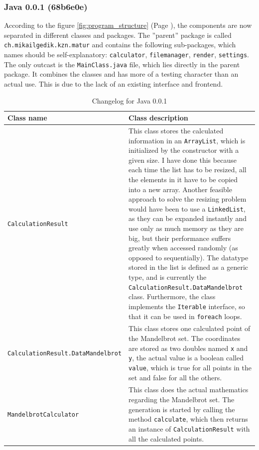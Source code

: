 \documentclass[10pt,a4paper,titlepage]{article}
\begin{document}
	\subsubsection{Java 0.0.1 (68b6e0e)}
	According to the figure \ref{fig:program_structure} (Page \pageref{fig:program_structure}), the components are now separated in different classes and packages. The ''parent'' package is called \verb|ch.mikailgedik.kzn.matur| and contains the following sub-packages, which names should be self-explanatory: \verb|calculator|, \verb|filemanager|, \verb|render|, \verb|settings|. The only outcast is the \verb|MainClass.java| file, which lies directly in the parent package. It combines the classes and has more of a testing character than an actual use. This is due to the lack of an existing interface and frontend.\\
	\begin{table}[h!]
		\centering
		\label{tab:java_0_0_1}
		\caption{Changelog for Java 0.0.1}
		\begin{tabular}{p{}|p{}}
			Class name & Class description \\ 
			\hline 
			\verb|CalculationResult|&  This class stores the calculated information in an \verb|ArrayList|, which is initialized by the constructor with a given size. I have done this because each time the list has to be resized, all the elements in it have to be copied into a new array. Another feasible approach to solve the resizing problem would have been to use a \verb|LinkedList|, as they can be expanded instantly and use only as much memory as they are big, but their performance suffers greatly when accessed randomly (as opposed to sequentially). \newline
			The datatype stored in the list is defined as a generic type, and is currently the \verb|CalculationResult.DataMandelbrot| class. Furthermore, the class implements the \verb|Iterable| interface, so that it can be used in \verb|foreach| loops. \\
			\hline 
			\verb|CalculationResult.|\linebreak \hspace*{50 pt}\verb|DataMandelbrot|& This class stores one calculated point of the Mandelbrot set. The coordinates are stored as two doubles named \verb|x| and \verb|y|, the actual value is a boolean called \verb|value|, which is true for all points in the set and false for all the others.\\ 
			\hline 
			\verb|MandelbrotCalculator|& This class does the actual mathematics regarding the Mandelbrot set. The generation is started by calling the method \verb|calculate|, which then returns an instance of \verb|CalculationResult| with all the calculated points.

\end{tabular}
\end{table}
\end{document}
